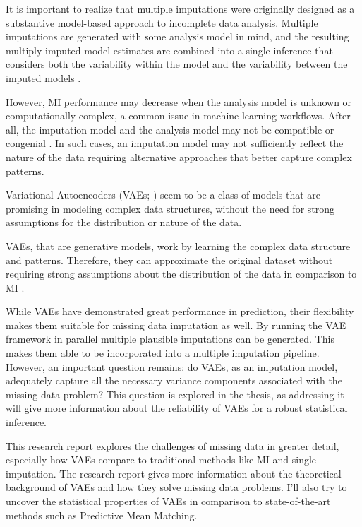 \documentclass[10pt, a4paper]{article}
\begin{document}
It is important to realize that multiple imputations were originally designed as a substantive model-based approach to incomplete data analysis. Multiple imputations are generated with some analysis model in mind, and the resulting multiply imputed model estimates are combined into a single inference that considers both the variability within the model and the variability between the imputed models \parencite{Rubin1987,vanBuuren2018}.  

However, MI performance may decrease when the analysis model is unknown or computationally complex, a common issue in machine learning workflows. After all, the imputation model and the analysis model may not be compatible or congenial \parencite{Meng 1994}. In such cases, an imputation model may not sufficiently reflect the nature of the data requiring alternative approaches that better capture complex patterns. 

Variational Autoencoders (VAEs; \parencite{KingmaWelling 2013}) seem to be a class of models that are promising in modeling complex data structures, without the need for strong assumptions for the distribution or nature of the data.  

VAEs, that are generative models, work by learning the complex data structure and patterns. Therefore, they can approximate the original dataset without requiring strong assumptions about the distribution of the data in comparison to MI \parencite{Qui 2020}.  

While VAEs have demonstrated great performance in prediction, their flexibility makes them suitable for missing data imputation as well. By running the VAE framework in parallel multiple plausible imputations can be generated. This makes them able to be incorporated into a multiple imputation pipeline. However, an important question remains: do VAEs, as an imputation model, adequately capture all the necessary variance components associated with the missing data problem? This question is explored in the thesis, as addressing it will give more information about the reliability of VAEs for a robust statistical inference. 

This research report explores the challenges of missing data in greater detail, especially how VAEs compare to traditional methods like MI and single imputation. The research report gives more information about the theoretical background of VAEs and how they solve missing data problems. I’ll also try to uncover the statistical properties of VAEs in comparison to state-of-the-art methods such as Predictive Mean Matching. 
\end{document}
